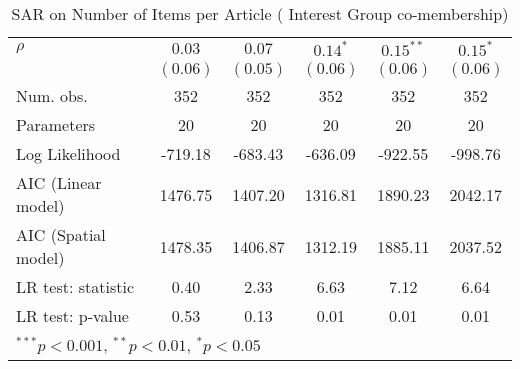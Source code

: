 \begin{table}[!h]
\begin{center}
\begin{tabular}{l c c c c c }
$\rho$                  & $0.03$       & $0.07$       & $0.14^{*}$   & $0.15^{**}$  & $0.15^{*}$   \\
                        & $(0.06)$     & $(0.05)$     & $(0.06)$     & $(0.06)$     & $(0.06)$     \\
\midrule
Num. obs.               & 352          & 352          & 352          & 352          & 352          \\
Parameters              & 20           & 20           & 20           & 20           & 20           \\
Log Likelihood          & -719.18      & -683.43      & -636.09      & -922.55      & -998.76      \\
AIC (Linear model)      & 1476.75      & 1407.20      & 1316.81      & 1890.23      & 2042.17      \\
AIC (Spatial model)     & 1478.35      & 1406.87      & 1312.19      & 1885.11      & 2037.52      \\
LR test: statistic      & 0.40         & 2.33         & 6.63         & 7.12         & 6.64         \\
LR test: p-value        & 0.53         & 0.13         & 0.01         & 0.01         & 0.01         \\
\bottomrule
\multicolumn{6}{l}{\scriptsize{$^{***}p<0.001$, $^{**}p<0.01$, $^*p<0.05$}}
\end{tabular}
\caption{SAR on Number of Items per Article ( Interest Group co-membership)}
\label{table:coefficients}
\end{center}
\end{table}
